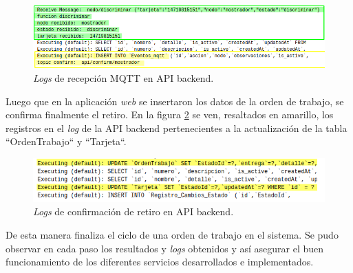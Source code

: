 \begin{figure}[H]
	\centering
	\includegraphics[width=\textwidth]{./Figures/ensayo-1/22.retirar-api-evento.png}
	\caption{\textit{Logs} de recepción MQTT en API backend.}
	\label{fig:ensayoretirarapievento}
\end{figure}

Luego que en la aplicación \textit{web} se insertaron los datos de la orden de trabajo, se confirma finalmente el retiro. En la figura \ref{fig:ensayoretirarconfirmacionapi} se ven, resaltados en amarillo, los registros en el \textit{log} de la API backend pertenecientes a la actualización de la tabla ``OrdenTrabajo`` y ``Tarjeta``. 
 
\begin{figure}[H]
	\centering
	\includegraphics[width=\textwidth]{./Figures/ensayo-1/24.retirar-confirmacion-api.png}
	\caption{\textit{Logs} de confirmación de retiro en API backend.}
	\label{fig:ensayoretirarconfirmacionapi}
\end{figure}

De esta manera finaliza el ciclo de una orden de trabajo en el sistema. Se pudo observar en cada paso los resultados y \textit{logs} obtenidos y así asegurar el buen funcionamiento de los diferentes servicios desarrollados e implementados.




